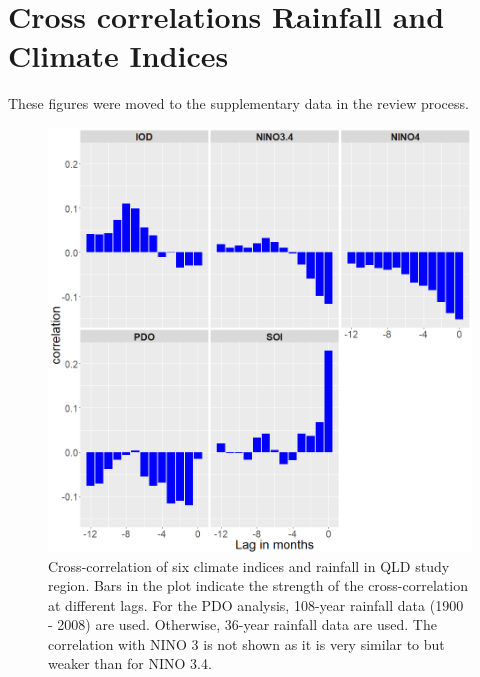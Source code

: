 \documentclass[fleqn,10pt,lineno]{wlpeerj} %
\theoremstyle{definition}
\theoremstyle{definition}
\theoremstyle{definition}
\theoremstyle{remark}
\begin{document}
\newpage

\section{Cross correlations Rainfall and Climate
Indices}\label{cross-correlations-rainfall-and-climate-indices}

These figures were moved to the supplementary data in the review
process.

\begin{figure}
\includegraphics[width=0.9\linewidth]{figures/FigS1} \caption{Cross-correlation of six climate indices and rainfall in QLD study region. Bars in the plot indicate the strength of the cross-correlation at different lags. For the PDO analysis, 108-year rainfall data (1900 - 2008) are used. Otherwise, 36-year rainfall data are used. The correlation with NINO 3 is not shown as it is very similar to but weaker than for NINO 3.4.}\label{fig:cor-rain-qld}
\end{figure}
\end{document}
